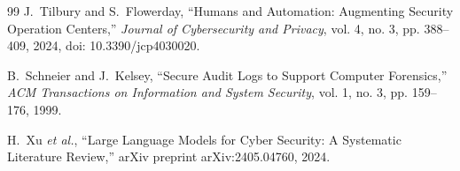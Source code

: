 \documentclass[conference]{IEEEtran}
\begin{document}
\begin{thebibliography}{99}
 J.~Tilbury and S.~Flowerday, ``Humans and Automation: Augmenting Security Operation Centers,'' \emph{Journal of Cybersecurity and Privacy}, vol. 4, no. 3, pp. 388--409, 2024, doi: 10.3390/jcp4030020.

 B.~Schneier and J.~Kelsey, ``Secure Audit Logs to Support Computer Forensics,'' \emph{ACM Transactions on Information and System Security}, vol. 1, no. 3, pp. 159--176, 1999.

 H.~Xu \emph{et al.}, ``Large Language Models for Cyber Security: A Systematic Literature Review,'' arXiv preprint arXiv:2405.04760, 2024.

\end{thebibliography}
\end{document}
